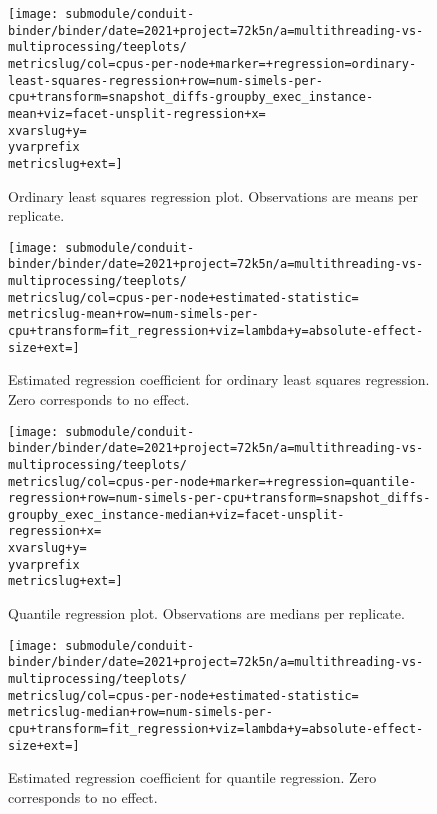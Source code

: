 \begin{figure*}
  \centering

  \begin{subfigure}[b]{0.5\textwidth}
    \centering
    \texttt{[image: submodule/conduit-binder/binder/date=2021+project=72k5n/a=multithreading-vs-multiprocessing/teeplots/\\metricslug/col=cpus-per-node+marker=+regression=ordinary-least-squares-regression+row=num-simels-per-cpu+transform=snapshot\_diffs-groupby\_exec\_instance-mean+viz=facet-unsplit-regression+x=\\xvarslug+y=\\yvarprefix\\metricslug+ext=]}
    \caption{
      Ordinary least squares regression plot.
      Observations are means per replicate.
    }
    \label{fig:multithreading-vs-multiprocessing-regression-ols-\metricslug-complete-regression}
  \end{subfigure}%
  \begin{subfigure}[b]{0.5\textwidth}
    \centering
    \texttt{[image: submodule/conduit-binder/binder/date=2021+project=72k5n/a=multithreading-vs-multiprocessing/teeplots/\\metricslug/col=cpus-per-node+estimated-statistic=\\metricslug-mean+row=num-simels-per-cpu+transform=fit\_regression+viz=lambda+y=absolute-effect-size+ext=]}
    \caption{Estimated regression coefficient for ordinary least squares regression. Zero corresponds to no effect.}
    \label{fig:multithreading-vs-multiprocessing-regression-ols-\metricslug-complete-effect-size}
  \end{subfigure}

  \begin{subfigure}[b]{0.5\textwidth}
    \centering
    \texttt{[image: submodule/conduit-binder/binder/date=2021+project=72k5n/a=multithreading-vs-multiprocessing/teeplots/\\metricslug/col=cpus-per-node+marker=+regression=quantile-regression+row=num-simels-per-cpu+transform=snapshot\_diffs-groupby\_exec\_instance-median+viz=facet-unsplit-regression+x=\\xvarslug+y=\\yvarprefix\\metricslug+ext=]}
    \caption{
      Quantile regression plot.
      Observations are medians per replicate.
    }
    \label{fig:multithreading-vs-multiprocessing-regression-quantile-\metricslug-complete-regression}
  \end{subfigure}%
  \begin{subfigure}[b]{0.5\textwidth}
    \centering
    \texttt{[image: submodule/conduit-binder/binder/date=2021+project=72k5n/a=multithreading-vs-multiprocessing/teeplots/\\metricslug/col=cpus-per-node+estimated-statistic=\\metricslug-median+row=num-simels-per-cpu+transform=fit\_regression+viz=lambda+y=absolute-effect-size+ext=]}
    \caption{Estimated regression coefficient for quantile regression. Zero corresponds to no effect.}
    \label{fig:multithreading-vs-multiprocessing-regression-quantile-\metricslug-complete-effect-size}
  \end{subfigure}


\end{figure*}

